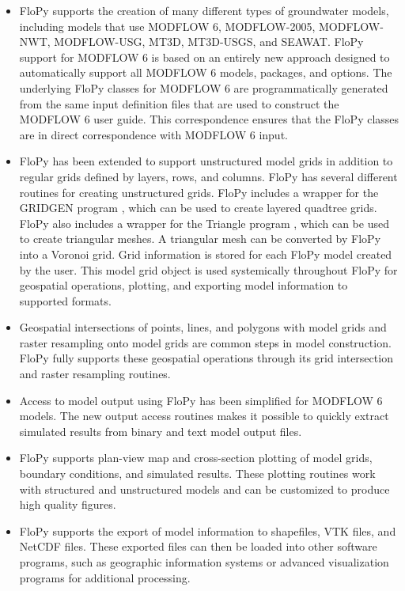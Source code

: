 \documentclass[11pt, oneside]{article}  	%
\begin{document}
\begin{itemize}
\item FloPy supports the creation of many different types of groundwater models, including models that use MODFLOW 6, MODFLOW-2005, MODFLOW-NWT, MODFLOW-USG, MT3D, MT3D-USGS, and SEAWAT. FloPy support for MODFLOW 6 is based on an entirely new approach designed to automatically support all MODFLOW 6 models, packages, and options. The underlying FloPy classes for MODFLOW 6 are programmatically generated from the same input definition files that are used to construct the MODFLOW 6 user guide. This correspondence ensures that the FloPy classes are in direct correspondence with MODFLOW 6 input.

\item FloPy has been extended to support unstructured model grids in addition to regular grids defined by layers, rows, and columns. FloPy has several different routines for creating unstructured grids. FloPy includes a wrapper for the GRIDGEN program \citep{gridgen}, which can be used to create layered quadtree grids. FloPy also includes a wrapper for the Triangle program \citep{trianglemesh}, which can be used to create triangular meshes. A triangular mesh can be converted by FloPy into a Voronoi grid. Grid information is stored for each FloPy model created by the user. This model grid object is used systemically throughout FloPy for geospatial operations, plotting, and exporting model information to supported formats.

\item Geospatial intersections of points, lines, and polygons with model grids and raster resampling onto model grids are common steps in model construction. FloPy fully supports these geospatial operations through its grid intersection and raster resampling routines.

\item Access to model output using FloPy has been simplified for MODFLOW 6 models.  The new output access routines makes it possible to quickly extract simulated results from binary and text model output files.

\item FloPy supports plan-view map and cross-section plotting of model grids, boundary conditions, and simulated results.  These plotting routines work with structured and unstructured models and can be customized to produce high quality figures.

\item FloPy supports the export of model information to shapefiles, VTK files, and NetCDF files.  These exported files can then be loaded into other software programs, such as geographic information systems or advanced visualization programs for additional processing.

\end{itemize}
\end{document}
